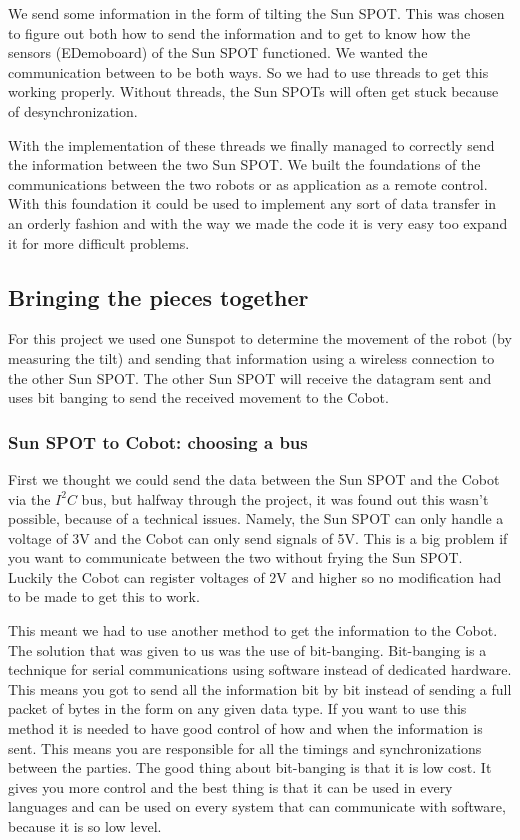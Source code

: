 \documentclass[a4paper,10pt]{article} %
\begin{document}
We send some information in the form of tilting the Sun SPOT. This was chosen
to figure out both how to send the information and to get to know how the
sensors (EDemoboard) of the Sun SPOT functioned. We wanted the communication
between to be both ways. So we had to use threads to get this working properly.
Without threads, the Sun SPOTs will often get stuck because of desynchronization.

With the implementation of these threads we finally managed to correctly send
the information between the two Sun SPOT. We built the foundations of the
communications between the two robots or as application as a remote control.
With this foundation it could be used to implement any sort of data transfer in
an orderly fashion and with the way we made the code it is very easy too expand
it for more difficult problems.



\subsection{Bringing the pieces together} %
\label{subsec:Bringing the pieces together}

For this project we used one Sunspot to determine the movement of the robot (by
measuring the tilt) and sending that information using a wireless connection to
the other Sun SPOT. The other Sun SPOT will receive the datagram sent and uses
bit banging to send the received movement to the Cobot.

\subsubsection{Sun SPOT to Cobot: choosing a bus} %
\label{ssub:bitbang}

First we thought we could send the data between the Sun SPOT and the Cobot via
the $I^2C$ bus, but halfway through the project, it was found out this wasn't
possible, because of a technical issues. Namely, the Sun SPOT can only handle a
voltage of 3V and the Cobot can only send signals of 5V. This is a big problem
if you want to communicate between the two without frying the Sun SPOT. Luckily
the Cobot can register voltages of 2V and higher so no modification had to be
made to get this to work.

This meant we had to use another method to get the information to the Cobot. The
solution that was given to us was the use of bit-banging. Bit-banging is a
technique for serial communications using software instead of dedicated
hardware. This means you got to send all the information bit by bit instead of
sending a full packet of bytes in the form on any given data type. If you want
to use this method it is needed to have good control of how and when the
information is sent. This means you are responsible for all the timings and
synchronizations between the parties. The good thing about bit-banging is that
it is low cost. It gives you more control and the best thing is that it can be
used in every languages and can be used on every system that can communicate
with software, because it is so low level.
\end{document}
